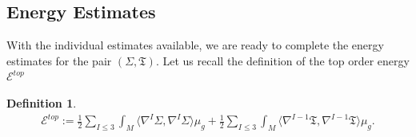 \documentclass{amsart}
\newtheorem{definition}{Definition}
\begin{document}
\subsection{Energy Estimates}
\label{energy}
\noindent With the individual estimates available, we are ready to complete the energy estimates for the pair $(\Sigma,\mathfrak{T})$. Let us recall the definition of the top order energy $\mathscr{E}^{top}$
\begin{definition}
\label{toporder}
\begin{align}
\mathscr{E}^{top}:=\frac{1}{2}\sum_{I\leq 3}\int_{M}\langle\nabla^{I}\Sigma,\nabla^{I}\Sigma\rangle \mu_{g}+\frac{1}{2}\sum_{I\leq 3}\int_{M}\langle\nabla^{I-1}\mathfrak{T},\nabla^{I-1}\mathfrak{T}\rangle\mu_{g}.    
\end{align}    
\end{definition}
\end{document}
